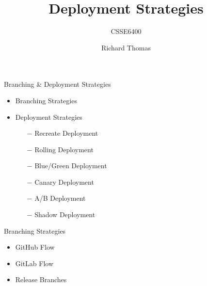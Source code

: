 \documentclass{slide}
\title{Deployment Strategies}
\subtitle{CSSE6400}
\author{Richard Thomas}
\date{\week{11}}
\begin{document}
\maketitle

\begin{frame}{Branching \& Deployment Strategies}
  \vspace{1pt}
  {\huge
    \begin{itemize}
        \item Branching Strategies
        \vspace{8pt}
        \item Deployment Strategies
	    \begin{itemize}
	        \LARGE\item[$-$] Recreate Deployment
	        \LARGE\item[$-$] Rolling Deployment
	        \LARGE\item[$-$] Blue/Green Deployment
	        \LARGE\item[$-$] Canary Deployment
	        \LARGE\item[$-$] A/B Deployment
	        \LARGE\item[$-$] Shadow Deployment
	    \end{itemize}
    \end{itemize}
  }
\end{frame}


\begin{frame}{Branching Strategies}
  \vspace{1pt}
  {\huge{
    \begin{itemize}
        \item GitHub Flow
        \item GitLab Flow
        \item Release Branches
    \end{itemize}
  }}
\end{frame}
\end{document}

